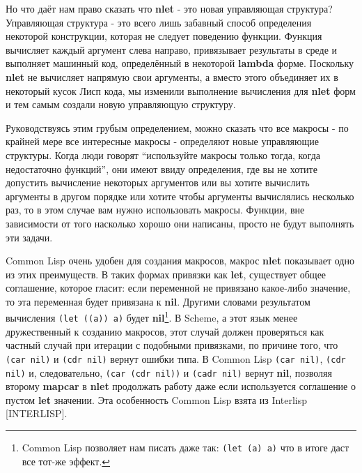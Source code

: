 Но что даёт нам право сказать что \textbf{nlet} - это новая управляющая структура? Управляющая структура - это всего лишь забавный способ определения некоторой конструкции, которая не следует поведению функции. Функция вычисляет каждый аргумент слева направо, привязывает результаты в среде и выполняет машинный код, определённый в некоторой \textbf{lambda} форме. Поскольку \textbf{nlet} не вычисляет напрямую свои аргументы, а вместо этого объединяет их в некоторый кусок Лисп кода, мы изменили выполнение вычисления для \textbf{nlet} форм и тем самым создали новую управляющую структуру.

Руководствуясь этим грубым определением, можно сказать что все макросы - по крайней мере все интересные макросы - определяют новые управляющие структуры. Когда люди говорят ``используйте макросы только тогда, когда недостаточно функций'', они имеют ввиду определения, где вы не хотите допустить вычисление некоторых аргументов или вы хотите вычислить аргументы в другом порядке или хотите чтобы аргументы вычислялись несколько раз, то в этом случае вам нужно использовать макросы. Функции, вне зависимости от того насколько хорошо они написаны, просто не будут выполнять эти задачи.

Common Lisp очень удобен для создания макросов, макрос \textbf{nlet} показывает одно из этих преимуществ. В таких формах привязки как \textbf{let}, существует общее соглашение, которое гласит: если переменной не привязано какое-либо значение, то эта переменная будет привязана к \textbf{nil}. Другими словами результатом вычисления \verb"(let ((a)) a)" будет \textbf{nil}\footnote{Common Lisp позволяет нам писать даже так: \verb"(let (a) a)" что в итоге даст все тот-же эффект.}. В Scheme, а этот язык менее дружественный к созданию макросов, этот случай должен проверяться как частный случай при итерации с подобными привязками, по причине того, что \verb"(car nil)" и \verb"(cdr nil)" вернут ошибки типа. В Common Lisp \verb"(car nil)", \verb"(cdr nil)" и, следовательно, \verb"(car (cdr nil))" и \verb"(cadr nil)" вернут \textbf{nil}, позволяя второму \textbf{mapcar} в \textbf{nlet} продолжать работу даже если используется соглашение о пустом \textbf{let} значении. Эта особенность Common Lisp взята из Interlisp [INTERLISP].

